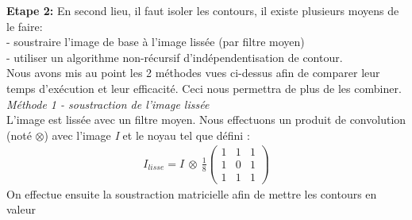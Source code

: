 \documentclass{article}
\begin{document}
			\textbf{Etape 2: }En second lieu, il faut isoler les contours, il existe plusieurs moyens de le faire:\\
			- soustraire l'image de base à l'image lissée (par filtre moyen)\\
			- utiliser un algorithme non-récursif d'indépendentisation de contour.\\
			Nous avons mis au point les 2 méthodes vues ci-dessus afin de comparer leur temps d'exécution et leur efficacité. Ceci nous permettra de plus de les combiner.\\
			
			\emph{Méthode 1 - soustraction de l'image lissée}\\
			L'image est lissée avec un filtre moyen. Nous effectuons un produit de convolution (noté \begin{math}\otimes\end{math}) avec l'image \emph{I} et le noyau tel que défini :
			\begin{align*}
				I_{lisse} = I\ \otimes\ \frac{1}{8} \begin{pmatrix}
					1 & 1 & 1\\
					1 & 0 & 1\\
					1 & 1 & 1
				\end{pmatrix} 
			\end{align*}
			On effectue ensuite la soustraction matricielle afin de mettre les contours en valeur\\
			
\end{document}
